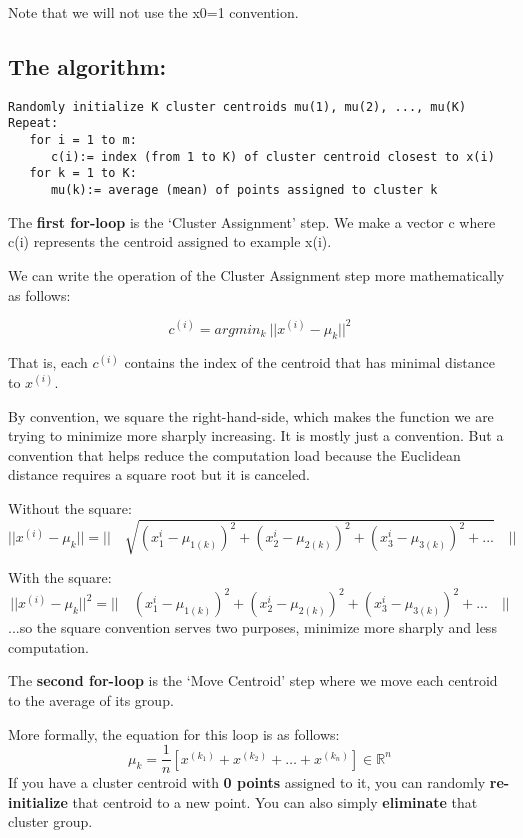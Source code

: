Note that we will not use the x0=1 convention.

\subsection{The algorithm:}
\begin{verbatim}
Randomly initialize K cluster centroids mu(1), mu(2), ..., mu(K)
Repeat:
   for i = 1 to m:
      c(i):= index (from 1 to K) of cluster centroid closest to x(i)
   for k = 1 to K:
      mu(k):= average (mean) of points assigned to cluster k
\end{verbatim}
The \textbf{first for-loop} is the `Cluster Assignment' step. We make a vector c where c(i) represents the centroid assigned to example x(i).

We can write the operation of the Cluster Assignment step more mathematically as follows:

\begin{equation}
c^{(i)} = argmin_k\ ||x^{(i)} - \mu_k||^2
\end{equation}

That is, each $c^{(i)}$ contains the index of the centroid that has minimal distance to $x^{(i)}$.

By convention, we square the right-hand-side, which makes the function we are trying to minimize more sharply increasing. It is mostly just a convention. But a convention that helps reduce the computation load because the Euclidean distance requires a square root but it is canceled.

Without the square:
\begin{equation}
||x^{(i)} - \mu_k|| = ||\quad\sqrt{(x_1^i - \mu_{1(k)})^2 + (x_2^i - \mu_{2(k)})^2 + (x_3^i - \mu_{3(k)})^2 + ...}\quad||
\end{equation}

With the square:
\begin{equation}
||x^{(i)} - \mu_k||^2 = ||\quad(x_1^i - \mu_{1(k)})^2 + (x_2^i - \mu_{2(k)})^2 + (x_3^i - \mu_{3(k)})^2 + ...\quad||
\end{equation}
...so the square convention serves two purposes, minimize more sharply and less computation.

The \textbf{second for-loop} is the `Move Centroid' step where we move each centroid to the average of its group.

More formally, the equation for this loop is as follows:
\begin{equation}
\mu_k = \dfrac{1}{n}[x^{(k_1)} + x^{(k_2)} + \dots + x^{(k_n)}] \in \mathbb{R}^n
\end{equation}
If you have a cluster centroid with \textbf{0 points} assigned to it, you can randomly \textbf{re-initialize} that centroid to a new point. You can also simply \textbf{eliminate} that cluster group.

